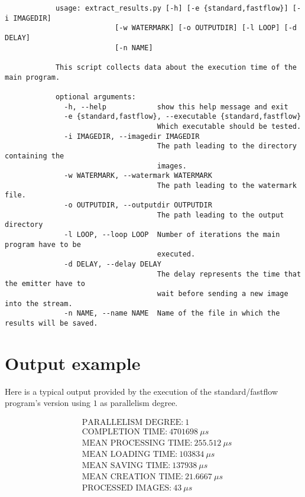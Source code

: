         \begin{verbatim}
            usage: extract_results.py [-h] [-e {standard,fastflow}] [-i IMAGEDIR]
                          [-w WATERMARK] [-o OUTPUTDIR] [-l LOOP] [-d DELAY]
                          [-n NAME]

            This script collects data about the execution time of the main program.

            optional arguments:
              -h, --help            show this help message and exit
              -e {standard,fastflow}, --executable {standard,fastflow}
                                    Which executable should be tested.
              -i IMAGEDIR, --imagedir IMAGEDIR
                                    The path leading to the directory containing the
                                    images.
              -w WATERMARK, --watermark WATERMARK
                                    The path leading to the watermark file.
              -o OUTPUTDIR, --outputdir OUTPUTDIR
                                    The path leading to the output directory
              -l LOOP, --loop LOOP  Number of iterations the main program have to be
                                    executed.
              -d DELAY, --delay DELAY
                                    The delay represents the time that the emitter have to
                                    wait before sending a new image into the stream.
              -n NAME, --name NAME  Name of the file in which the results will be saved.
        \end{verbatim}
    \section{Output example} %
    \label{sec:output_example}
        Here is a typical output provided by the execution of the standard/fastflow program's version using $1$
        as parallelism degree.

        \begin{align*}
            &\text{PARALLELISM DEGREE:} \ 1 \\
            &\text{COMPLETION TIME:} \ 4701698 \ \mu s \\
            &\text{MEAN PROCESSING TIME:} \ 255.512 \ \mu s \\
            &\text{MEAN LOADING TIME:} \ 103834 \ \mu s \\
            &\text{MEAN SAVING TIME:} \ 137938 \ \mu s \\
            &\text{MEAN CREATION TIME:} \ 21.6667 \ \mu s \\
            &\text{PROCESSED IMAGES:} \ 43 \ \mu s \\
        \end{align*}

